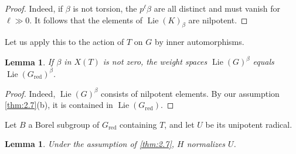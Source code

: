 \documentclass[11pt,a4paper]{article}
\theoremstyle{plain}
\newtheorem{lemma}[theorem]{Lemma}
\theoremstyle{definition}
\DeclareMathOperator{\Lie}{Lie}
\newcommand{\red}{\mathrm{red}}
\begin{document}
\begin{proof}
Indeed, if $\beta$ is not torsion, the $p^\ell \beta$ are all distinct and must vanish for $\ell \gg 0$. It follows that the elements of $\Lie(K)_\beta$ are nilpotent. \qedhere
\end{proof}

Let us apply this to the action of $T$ on $G$ by inner automorphisms.

\begin{lemma} \label{lem:2.11}
If $\beta$ in $X(T)$ is not zero, the weight spaces $\Lie(G)^\beta$ equals $\Lie(G_\red)^\beta$.
\end{lemma}

\begin{proof}
Indeed, $\Lie(G)^\beta$ consists of nilpotent elements. By our assumption \ref{thm:2.7}(b), it is contained in $\Lie(G_\red)$. \qedhere
\end{proof}

Let $B$ a Borel subgroup of $G_\red$ containing $T$, and let $U$ be its unipotent radical.

\begin{lemma} \label{lem:2.12}
Under the assumption of \ref{thm:2.7}, $H$ normalizes $U$.
\end{lemma}
\end{document}
